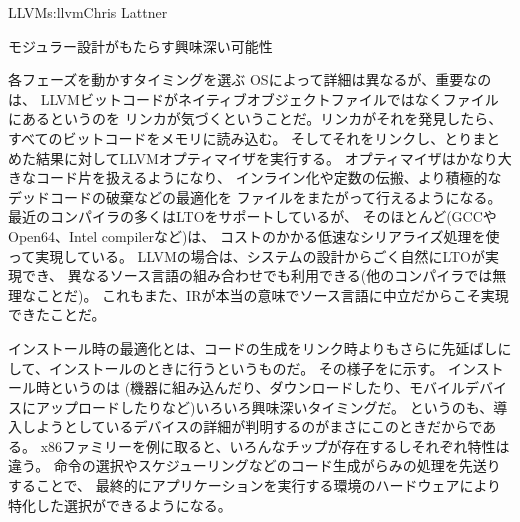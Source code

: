 \begin{aosachapter}{LLVM}{s:llvm}{Chris Lattner}
\begin{aosasect1}{モジュラー設計がもたらす興味深い可能性}
\begin{aosasect2}{各フェーズを動かすタイミングを選ぶ}
OSによって詳細は異なるが、重要なのは、
LLVMビットコードがネイティブオブジェクトファイルではなくファイルにあるというのを
リンカが気づくということだ。リンカがそれを発見したら、すべてのビットコードをメモリに読み込む。
そしてそれをリンクし、とりまとめた結果に対してLLVMオプティマイザを実行する。
オプティマイザはかなり大きなコード片を扱えるようになり、
インライン化や定数の伝搬、より積極的なデッドコードの破棄などの最適化を
ファイルをまたがって行えるようになる。最近のコンパイラの多くはLTOをサポートしているが、
そのほとんど(GCCやOpen64、Intel compilerなど)は、
コストのかかる低速なシリアライズ処理を使って実現している。
LLVMの場合は、システムの設計からごく自然にLTOが実現でき、
異なるソース言語の組み合わせでも利用できる(他のコンパイラでは無理なことだ)。
これもまた、IRが本当の意味でソース言語に中立だからこそ実現できたことだ。

インストール時の最適化とは、コードの生成をリンク時よりもさらに先延ばしにして、インストールのときに行うというものだ。
その様子をに示す。
インストール時というのは
(機器に組み込んだり、ダウンロードしたり、モバイルデバイスにアップロードしたりなど)いろいろ興味深いタイミングだ。
というのも、導入しようとしているデバイスの詳細が判明するのがまさにこのときだからである。
x86ファミリーを例に取ると、いろんなチップが存在するしそれぞれ特性は違う。
命令の選択やスケジューリングなどのコード生成がらみの処理を先送りすることで、
最終的にアプリケーションを実行する環境のハードウェアにより特化した選択ができるようになる。


\end{aosasect2}
\end{aosasect1}
\end{aosachapter}
